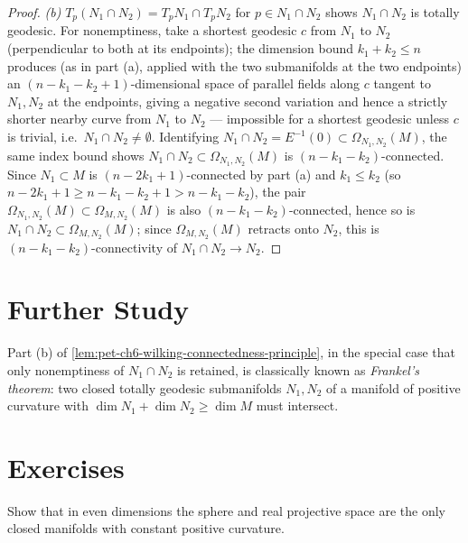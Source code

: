\begin{proof}
  \emph{(b)} $T_p(N_1\cap N_2)=T_pN_1\cap T_pN_2$ for $p\in N_1\cap N_2$ shows
  $N_1\cap N_2$ is totally geodesic. For nonemptiness, take a shortest
  geodesic $c$ from $N_1$ to $N_2$ (perpendicular to both at its endpoints);
  the dimension bound $k_1+k_2\le n$ produces (as in part (a), applied with
  the two submanifolds at the two endpoints) an
  $(n-k_1-k_2+1)$-dimensional space of parallel fields along $c$ tangent to
  $N_1,N_2$ at the endpoints, giving a negative second variation and hence a
  strictly shorter nearby curve from $N_1$ to $N_2$ — impossible for a
  shortest geodesic unless $c$ is trivial, i.e.\ $N_1\cap N_2\ne\emptyset$.
  Identifying $N_1\cap N_2=E^{-1}(0)\subset\Omega_{N_1,N_2}(M)$, the same
  index bound shows $N_1\cap N_2\subset\Omega_{N_1,N_2}(M)$ is
  $(n-k_1-k_2)$-connected. Since $N_1\subset M$ is $(n-2k_1+1)$-connected by
  part (a) and $k_1\le k_2$ (so $n-2k_1+1\ge n-k_1-k_2+1>n-k_1-k_2$), the pair
  $\Omega_{N_1,N_2}(M)\subset\Omega_{M,N_2}(M)$ is also
  $(n-k_1-k_2)$-connected, hence so is
  $N_1\cap N_2\subset\Omega_{M,N_2}(M)$; since $\Omega_{M,N_2}(M)$ retracts
  onto $N_2$, this is $(n-k_1-k_2)$-connectivity of $N_1\cap N_2\to N_2$.
\end{proof}

\section{Further Study}

\begin{remark}
  \label{rem:pet-ch6-frankel-theorem}
  Part (b) of \cref{lem:pet-ch6-wilking-connectedness-principle}, in the
  special case that only nonemptiness of $N_1\cap N_2$ is retained, is
  classically known as \emph{Frankel's theorem}: two closed totally geodesic
  submanifolds $N_1,N_2$ of a manifold of positive curvature with
  $\dim N_1+\dim N_2\ge\dim M$ must intersect.
\end{remark}

\section{Exercises}

\begin{remark}[Exercise 6.7.1]
  \label{rem:pet-ch6-ex-6-7-1}
  Show that in even dimensions the sphere and real projective space are the
  only closed manifolds with constant positive curvature.
\end{remark}

